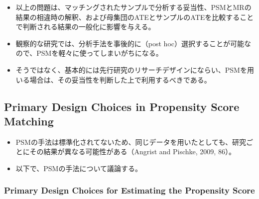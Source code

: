 \begin{itemize}
 \item 以上の問題は、マッチングされたサンプルで分析する妥当性、PSMとMRの結果の相違時の解釈、および母集団のATEとサンプルのATEを比較することで判断される結果の一般化に影響を与える。
 \item 観察的な研究では、分析手法を事後的に（post hoc）選択することが可能なので、PSMを軽々に使ってしまいがちになる。
 \item そうではなく、基本的には先行研究のリサーチデザインにならい、PSMを用いる場合は、その妥当性を判断した上で利用するべきである。
\end{itemize}

\subsection*{Primary Design Choices in Propensity Score Matching}

\begin{itemize}
 \item PSMの手法は標準化されてないため、同じデータを用いたとしても、研究ごとにその結果が異なる可能性がある（Angrist and Pischke, 2009, 86）。
 \item 以下で、PSMの手法について議論する。
\end{itemize}

\subsubsection*{Primary Design Choices for Estimating the Propensity Score}

